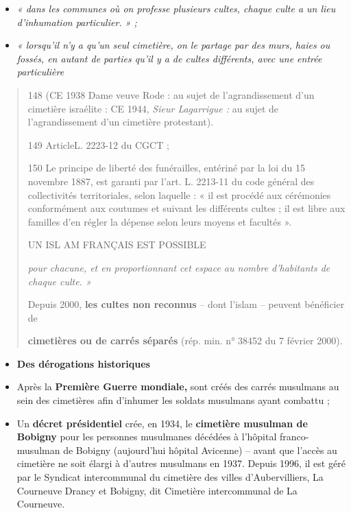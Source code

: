 \begin{itemize}
\item
  \emph{« dans les communes où on professe plusieurs cultes, chaque
  culte a un lieu d'inhumation particulier. » ;}
\item
  \emph{« lorsqu'il n'y a qu'un seul cimetière, on le partage par des
  murs, haies ou fossés, en autant de parties qu'il y a de cultes
  différents, avec une entrée particulière}
\end{itemize}

\begin{quote}
148 (CE 1938 Dame veuve Rode : au sujet de l'agrandissement d'un
cimetière israélite : CE 1944, \emph{Sieur Lagarrigue :} au sujet de
l'agrandissement d'un cimetière protestant).

149 ArticleL. 2223-12 du CGCT ;

150 Le principe de liberté des funérailles, entériné par la loi du 15
novembre 1887, est garanti par l'art. L. 2213-11 du code général des
collectivités territoriales, selon laquelle : « il est procédé aux
cérémonies conformément aux coutumes et suivant les différents cultes ;
il est libre aux familles d'en régler la dépense selon leurs moyens et
facultés ».

UN ISL AM FRANÇAIS EST POSSIBLE

\emph{pour chacune, et en proportionnant cet espace au nombre
d'habitants de chaque culte. »}

Depuis 2000, \textbf{les cultes non reconnus} -- dont l'islam -- peuvent
bénéficier de

\textbf{cimetières ou de carrés séparés} (rép. min. n° 38452 du 7
février 2000).
\end{quote}

\begin{itemize}
\item
  \textbf{Des dérogations historiques}
\end{itemize}

\begin{itemize}
\item
  Après la \textbf{Première Guerre mondiale,} sont créés des carrés
  musulmans au sein des cimetières afin d'inhumer les soldats musulmans
  ayant combattu ;
\item
  Un \textbf{décret présidentiel} crée, en 1934, le \textbf{cimetière
  musulman de Bobigny} pour les personnes musulmanes décédées à
  l'hôpital franco-musulman de Bobigny (aujourd'hui hôpital Avicenne) --
  avant que l'accès au cimetière ne soit élargi à d'autres musulmans en
  1937. Depuis 1996, il est géré par le Syndicat intercommunal du
  cimetière des villes d'Aubervilliers, La Courneuve Drancy et Bobigny,
  dit Cimetière intercommunal de La Courneuve.
\end{itemize}

